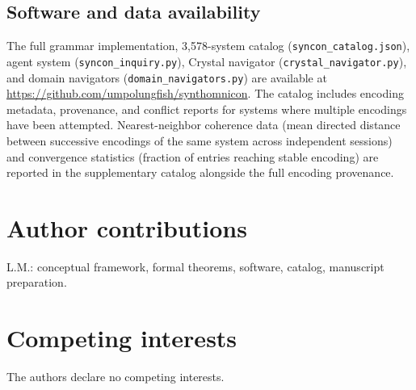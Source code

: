 \documentclass[12pt,a4paper]{article}
\begin{document}
\subsection{Software and data availability}

The full grammar implementation, 3,578-system catalog
(\texttt{syncon\_catalog.json}), agent system (\texttt{syncon\_inquiry.py}),
Crystal navigator (\texttt{crystal\_navigator.py}), and domain
navigators (\texttt{domain\_navigators.py}) are available at
\url{https://github.com/umpolungfish/synthomnicon}. The catalog
includes encoding metadata, provenance, and conflict reports for
systems where multiple encodings have been attempted.
Nearest-neighbor coherence data (mean directed distance between
successive encodings of the same system across independent sessions)
and convergence statistics (fraction of entries reaching stable
encoding) are reported in the supplementary catalog alongside the
full encoding provenance.


\section{Author contributions}
L.M.: conceptual framework, formal theorems, software, catalog, manuscript preparation.

\section{Competing interests}
The authors declare no competing interests.


\end{document}
